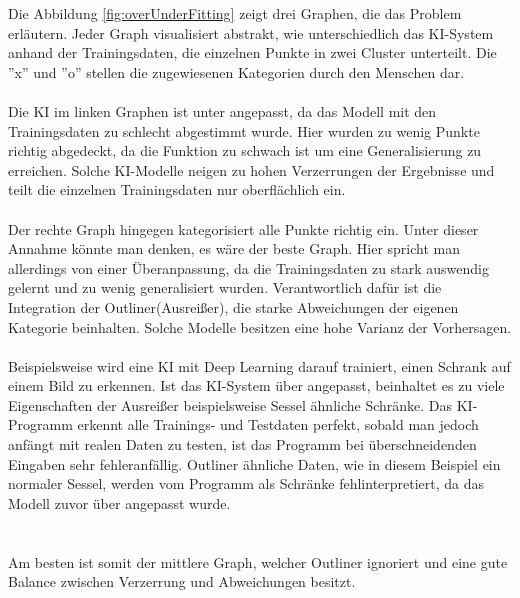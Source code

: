 \documentclass[12pt,oneside,a4paper,parskip]{scrbook}
\begin{document}
Die Abbildung \ref{fig:overUnderFitting} zeigt drei Graphen, die das Problem erläutern. Jeder Graph visualisiert abstrakt, wie unterschiedlich das KI-System anhand der Trainingsdaten, die einzelnen Punkte in zwei Cluster unterteilt. Die ''x'' und ''o'' stellen die zugewiesenen Kategorien durch den Menschen dar.
\\\\
Die KI im linken Graphen ist unter angepasst, da das Modell mit den Trainingsdaten zu schlecht abgestimmt wurde. Hier wurden zu wenig Punkte richtig abgedeckt, da die Funktion zu schwach ist um eine Generalisierung zu erreichen. Solche KI-Modelle neigen zu hohen Verzerrungen der Ergebnisse und teilt die einzelnen Trainingsdaten nur oberflächlich ein.
\\\\
Der rechte Graph hingegen kategorisiert alle Punkte richtig ein. Unter dieser Annahme könnte man denken, es wäre der beste Graph. Hier spricht man allerdings von einer Überanpassung, da die Trainingsdaten zu stark auswendig gelernt und zu wenig generalisiert wurden. Verantwortlich dafür ist die Integration der Outliner(Ausreißer), die starke Abweichungen der eigenen Kategorie beinhalten. Solche Modelle besitzen eine hohe Varianz der Vorhersagen\cite{overUnderfitting}.
\\\\
Beispielsweise wird eine KI mit Deep Learning darauf trainiert, einen Schrank auf einem Bild zu erkennen. Ist das KI-System über angepasst, beinhaltet es zu viele Eigenschaften der Ausreißer beispielsweise Sessel ähnliche Schränke. Das KI-Programm erkennt alle Trainings- und Testdaten perfekt, sobald man jedoch anfängt mit realen Daten zu testen, ist das Programm bei überschneidenden Eingaben sehr fehleranfällig. Outliner ähnliche Daten, wie in diesem Beispiel ein normaler Sessel, werden vom Programm als Schränke fehlinterpretiert, da das Modell zuvor über angepasst wurde. \\
\\\\
Am besten ist somit der mittlere Graph, welcher Outliner ignoriert und eine gute Balance zwischen Verzerrung und Abweichungen besitzt. 
\end{document}
